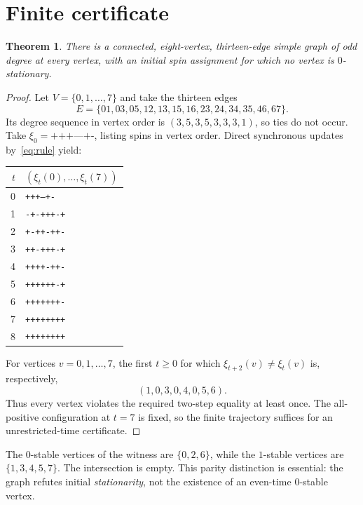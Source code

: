 \documentclass[11pt,a4paper]{article}
\newtheorem{theorem}{Theorem}
\begin{document}
\section{Finite certificate}
\begin{theorem}\label{thm:witness}
There is a connected, eight-vertex, thirteen-edge simple graph of odd degree at every vertex, with an initial spin assignment for which no vertex is $0$-stationary.
\end{theorem}
\begin{proof}
Let $V=\{0,1,\ldots,7\}$ and take the thirteen edges
\begin{equation}\label{eq:edges}
E=\{01,03,05,12,13,15,16,23,24,34,35,46,67\}.
\end{equation}
Its degree sequence in vertex order is $(3,5,3,5,3,3,3,1)$, so ties do not occur. Take $\xi_0=\texttt{+++---+-}$, listing spins in vertex order. Direct synchronous updates by~\eqref{eq:rule} yield:
\begin{center}
\begin{tabular}{@{}r l@{}}\toprule
$t$ & $(\xi_t(0),\ldots,\xi_t(7))$ \\ \midrule
0 & \texttt{+++---+-}\\
1 & \texttt{-+-+++-+}\\
2 & \texttt{+-++-++-}\\
3 & \texttt{++-+++-+}\\
4 & \texttt{++++-++-}\\
5 & \texttt{++++++-+}\\
6 & \texttt{+++++++-}\\
7 & \texttt{++++++++}\\
8 & \texttt{++++++++}\\\bottomrule
\end{tabular}
\end{center}
For vertices $v=0,1,\dots,7$, the first $t\geq0$ for which $\xi_{t+2}(v)\ne\xi_t(v)$ is, respectively,
\begin{equation}\label{eq:firstfailure}
(1,0,3,0,4,0,5,6).
\end{equation}
Thus every vertex violates the required two-step equality at least once. The all-positive configuration at $t=7$ is fixed, so the finite trajectory suffices for an unrestricted-time certificate.
\end{proof}
The $0$-stable vertices of the witness are $\{0,2,6\}$, while the $1$-stable vertices are $\{1,3,4,5,7\}$. The intersection is empty. This parity distinction is essential: the graph refutes initial \emph{stationarity}, not the existence of an even-time $0$-stable vertex.
\end{document}
